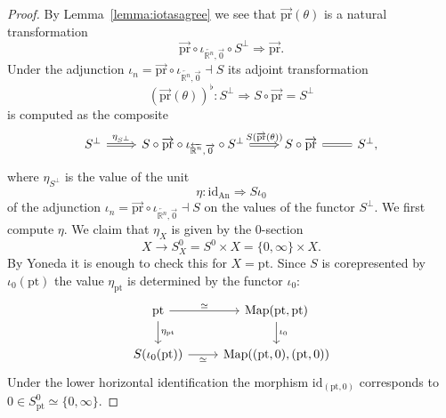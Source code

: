 \documentclass{article}
\newcommand{\R}{\mathbb{R}} %
\newcommand{\pt}{\mathrm{pt}}
\newcommand{\pr}{\mathrm{pr}}
\newcommand{\id}{\mathrm{id}}
\newcommand{\iotarnzero}{\iota_{\overleftarrow{\R^n},\overrightarrow{0}}}
\DeclareMathOperator{\An}{An}
\DeclareMathOperator{\Map}{Map}
\begin{document}
\begin{proof}
    By Lemma~\ref{lemma:iotasagree} we see that $\overrightarrow{\pr}(\theta)$ is a natural transformation 
    \[
      \overrightarrow{\pr} \circ \iotarnzero \circ S^\perp \Rightarrow \overrightarrow{\pr}.  
    \]
    Under the adjunction $\iota_n = \overrightarrow{\pr} \circ \iotarnzero \dashv S$ its adjoint transformation 
    \[
    (\overrightarrow{\pr}(\theta))^\flat \colon S^\perp \Rightarrow S \circ \overrightarrow{\pr} = S^\perp   
    \]
    is computed as the composite
    \[\begin{tikzcd}
        {S^\perp} & {S\circ\overrightarrow{\pr} \circ \iotarnzero \circ S^\perp} & {S \circ \overrightarrow{\pr}} & {S^\perp}
        \arrow["{\eta_{S^\perp}}", Rightarrow, from=1-1, to=1-2]
        \arrow["{S(\overrightarrow{\pr}(\theta))}", Rightarrow, from=1-2, to=1-3]
        \arrow[Rightarrow, no head, from=1-3, to=1-4],
    \end{tikzcd}\]
    where 
    $ \eta_{S^\perp}$ is the value of the unit    
    \[
        \eta \colon \id_{\An} \Rightarrow S\iota_0
    \]
    of the adjunction $\iota_n = \overrightarrow{\pr} \circ \iotarnzero \dashv S$
    on the values of the functor $S^\perp$.
    We first compute $\eta$.
    We claim that $\eta_X$ is given by the $0$-section 
    \[
    X \to S^0_X = S^0 \times X = \{0, \infty\} \times X. 
    \]
    By Yoneda it is enough to check this for $X = \pt$.
    Since $S$ is corepresented by $\iota_0(\pt)$ the value $\eta_\pt$ is determined by the functor $\iota_0$:
    \[\begin{tikzcd}
        \pt & {\Map(\pt,\pt)} \\
        {S(\iota_0(\pt))} & {\Map((\pt,0),(\pt,0))}
        \arrow["{\iota_0}", from=1-2, to=2-2]
        \arrow["{\eta_\pt}", from=1-1, to=2-1]
        \arrow["\simeq", from=1-1, to=1-2]
        \arrow["\simeq"', from=2-1, to=2-2]
    \end{tikzcd}\]
    Under the lower horizontal identification the morphism $\id_{(\pt,0)}$ corresponds to $0 \in S^0_\pt \simeq \{0,\infty\}$.


\end{proof}
\end{document}
